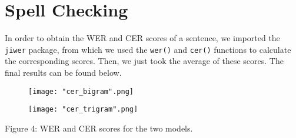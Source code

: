 \documentclass[11pt, a4paper]{article}
\begin{document}
	\section{Spell Checking}
	
	In order to obtain the WER and CER scores of a sentence, we imported the \texttt{jiwer} package, from which we used the \texttt{wer()} and \texttt{cer()} functions to calculate the corresponding scores. Then, we just took the average of these scores. The final results can be found below.

 \begin{figure}[H]
    \centering
    \texttt{[image: "cer\_bigram".png]}
    
    \label{fig:galaxy}
\end{figure}


 \begin{figure}[H]
    \centering
    \texttt{[image: "cer\_trigram".png]}
    
    \label{fig:galaxy}
\end{figure}


\begin{centering}



\renewcommand{\caption}{Figure 4: }
\caption{WER and CER scores for the two models.}

\end{centering} 
	
	
\end{document}
